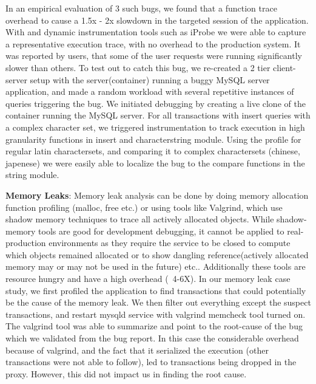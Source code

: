 In an empirical evaluation of 3 such bugs, we found that a function trace overhead to cause a 1.5x - 2x slowdown in the targeted session of the application. 
With \parikshan and dynamic instrumentation tools such as iProbe\cite{iProbe} we were able to capture a representative execution trace, with no overhead to the production system.
It was reported by users, that some of the user requests were running significantly slower than others.
To test out \parikshan to catch this bug, we re-created a 2 tier client-server setup with the server(container) running a buggy MySQL server application, and made a random workload with several repetitive instances of queries triggering the bug.
We initiated debugging by creating a live clone of the container running the MySQL server.
For all transactions with insert queries with a complex character set, we triggered instrumentation to track execution in high granularity functions in insert and character\/string module.
Using the profile for regular latin charactersets, and comparing it to complex charactersets (chinese, japenese) we were easily able to localize the bug to the compare functions in the string module.



\textbf{Memory Leaks}: %
Memory leak analysis can be done by doing memory allocation function profiling (malloc, free etc.) or using tools like Valgrind\cite{valgrind}, which use shadow memory techniques to trace all actively allocated objects.
While shadow-memory tools are good for development debugging, it cannot be applied to real-production environments as they require the service to be closed to compute which objects remained allocated or to show dangling reference(actively allocated memory may or may not be used in the future) etc.. Additionally these tools are resource hungry and have a high overhead (~4-6X).
In our memory leak case study, we first profiled the application to find transactions that could potentially be the cause of the memory leak. 
We then filter out everything except the suspect transactions, and restart mysqld service with valgrind memcheck tool turned on.
The valgrind tool was able to summarize and point to the root-cause of the bug which we validated from the bug report.
In this case the considerable overhead because of valgrind, and the fact that it serialized the execution (other transactions were not able to follow), led to transactions being dropped in the proxy. 
However, this did not impact us in finding the root cause.

